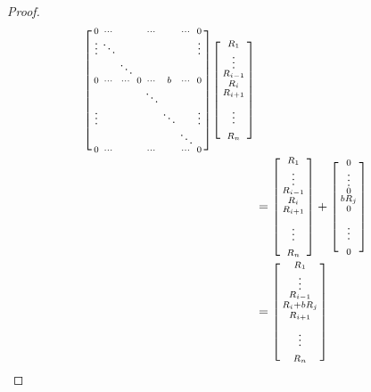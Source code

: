\begin{proof}
\begin{align}
\begin{split}
				\sbmqty{ %
						0 & \cdots & & & \cdots & & \cdots & 0 \\
						\vdots & \ddots & & & & & & \vdots \\
						& & \ddots & & & & & \\
						0 & \cdots & \cdots & 0 & \cdots & b & \cdots & 0 \\
						& & & & \ddots & & & \\
						\vdots & & & & & \ddots & & \vdots \\
						& & & & & & \ddots & \\
						0 & \cdots & & & \cdots & & \cdots & 0 %
						} %
				\sbmqty{ %
						R_{1} \\
						\vdots \\
						R_{i-1} \\
						R_{i} \\
						R_{i+1} \\
						\\
						\vdots \\
						\\
						R_{n} %
						} \\
			&= \sbmqty{ %
						R_{1} \\
						\vdots \\
						R_{i-1} \\
						R_{i} \\
						R_{i+1} \\
						\\
						\vdots \\
						\\
						R_{n} %
						} + %
				\sbmqty{ %
						0 \\
						\vdots \\
						0 \\ %
						b R_{j} \\
						0 \\
						\\
						\vdots \\
						\\
						0 %
						} \\
			&= \sbmqty{ %
						R_{1} \\
						\vdots \\
						R_{i-1} \\
						R_{i} + b R_{j} \\
						R_{i+1} \\
						\\
						\vdots \\
						\\
						R_{n} %
						}
		\end{split}
	\end{align}


\end{proof}
